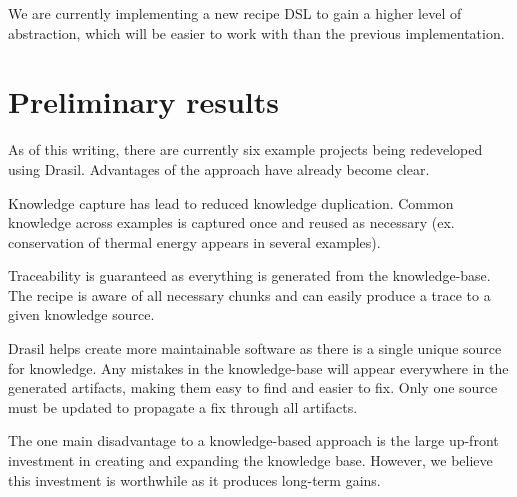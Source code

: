 \documentclass[twocolumn, 10pt]{article} %
\begin{document}
We are currently implementing a new recipe DSL to gain a higher level of
abstraction, which will be easier to work with than the previous implementation.

  
\section{Preliminary results}
As of this writing, there are currently six example projects being redeveloped
using Drasil. Advantages of the approach have already become clear.

Knowledge capture has lead to reduced knowledge duplication. Common knowledge
across examples is captured once and reused as necessary (ex. 
conservation of thermal energy appears in several examples).

Traceability is guaranteed as everything is generated from the knowledge-base.
The recipe is aware of all necessary chunks and can easily produce a trace to
a given knowledge source.

Drasil helps create more maintainable software as there is a single unique
source for knowledge. Any mistakes in the knowledge-base will appear everywhere
in the generated artifacts, making them easy to find and easier to fix. Only one
source must be updated to propagate a fix through all artifacts.

The one main disadvantage to a knowledge-based approach is the large up-front
investment in creating and expanding the knowledge base. However, we believe this
investment is worthwhile as it produces long-term gains.

%
%
\end{document}

